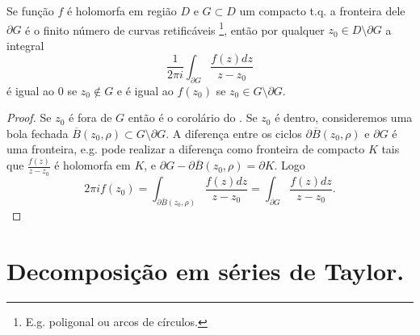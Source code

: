 \begin{teorema}
\label{formula-cauchy}
Se função $f$ é holomorfa em região $D$ e $G\subset D$ um compacto t.q. a fronteira dele $\partial G$ é o finito número de curvas retificáveis
\footnote{E.g. poligonal ou arcos de círculos.},
então por qualquer $z_0 \in D \setminus \partial G$ a integral
\[ \frac1{2\pi i} \int_{\partial G} \frac{f(z)dz}{z-z_0} \]
é igual ao $0$ se $z_0 \notin G$ e é igual ao $f(z_0)$ se $z_0 \in G \setminus \partial G$.
\end{teorema}
\begin{proof}
Se $z_0$ é fora de $G$ então é o corolário do .
Se $z_0$ é dentro, consideremos uma bola fechada $\overline{B}(z_0,\rho)\subset G \setminus \partial G$.
A diferença entre os ciclos $\partial \overline{B}(z_0,\rho)$ e $\partial G$ é uma fronteira,
e.g. pode realizar a diferença como fronteira de compacto $K$ tais que $\frac{f(z)}{z-z_0}$ é holomorfa em $K$,
e $\partial G - \partial \overline{B}(z_0,\rho) = \partial K$.
Logo 
\[ 2\pi i f(z_0) = \int_{\partial \overline{B}(z_0,\rho)} \frac{f(z)dz}{z-z_0} = \int_{\partial G} \frac{f(z)dz}{z-z_0}. \]
\end{proof}

\section{Decomposição em séries de Taylor.}

